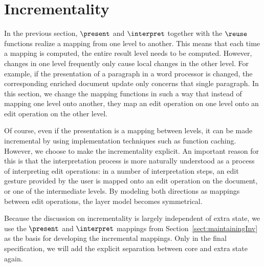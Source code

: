 



%																
\section{Incrementality} \label{sect:maintainingInc}

In the previous section, $\present$ and $\interpret$ together with the $\reuse$ functions realize a mapping from one level to another. This means that each time a mapping is computed, the entire result level needs to be computed. However, changes in one level frequently only cause local changes in the other level. For example, if the presentation of a paragraph in a word processor is changed, the corresponding enriched document update only concerns that single paragraph. In this section, we change the mapping functions in such a way that instead of mapping one level onto another, they map an edit operation on one level onto an edit operation on the other level. 

Of course, even if the presentation is a mapping between levels, it can be made incremental by using implementation techniques such as function caching. However, we choose to make the incrementality explicit. An important reason for this is that the interpretation process is more naturally understood as a process of interpreting edit operations: in a number of interpretation steps, an edit gesture provided by the user is mapped onto an edit operation on the document, or one of the intermediate levels. By modeling both directions as mappings between edit operations, the layer model becomes symmetrical. 

Because the discussion on incrementality is largely independent of extra state, we use the $\present$ and $\interpret$ mappings from Section~\ref{sect:maintainingInv} as the basis for developing the incremental mappings. Only in the final specification, we will add the explicit separation between core and extra state again.




